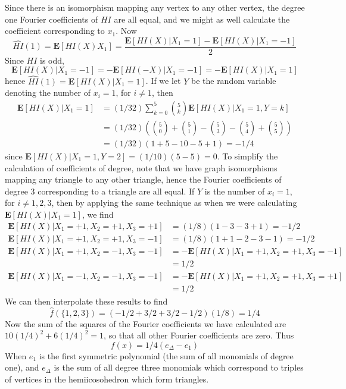 \begin{example}
    Since there is an isomorphism mapping any vertex to any other vertex, the degree one Fourier coefficients of $HI$ are all equal, and we might as well calculate the coefficient corresponding to $x_1$. Now
    \[ \widehat{HI}(1) = \mathbf{E}[HI(X)X_1] = \frac{\mathbf{E}[HI(X) | X_1 = 1] - \mathbf{E}[HI(X) | X_1 = -1]}{2} \]
    Since $HI$ is odd,
    \[ \mathbf{E}[HI(X) | X_1 = -1] = -\mathbf{E}[HI(-X) | X_1 = -1] = -\mathbf{E}[HI(X) | X_1 = 1] \]
    hence $\widehat{HI}(1) = \mathbf{E}[HI(X) | X_1 = 1]$. If we let $Y$ be the random variable denoting the number of $x_i = 1$, for $i \neq 1$, then
    \begin{align*}
        \mathbf{E}[HI(X) | X_1 = 1] &= (1/32) \sum_{k = 0}^5 {5 \choose k} \mathbf{E}[HI(X)|X_1 = 1, Y = k]\\
        &= (1/32) \left( {5 \choose 0} + {5 \choose 1} - {5 \choose 3} - {5 \choose 4} + {5 \choose 5} \right)\\
        &= (1/32)(1 + 5 - 10 - 5 + 1) = -1/4
    \end{align*}
    since $\mathbf{E}[HI(X) | X_1 = 1, Y = 2] = (1/10)(5 - 5) = 0$. To simplify the calculation of coefficients of degree, note that we have graph isomorphisms mapping any triangle to any other triangle, hence the Fourier coefficients of degree 3 corresponding to a triangle are all equal. If $Y$ is the number of $x_i = 1$, for $i \neq 1,2,3$, then by applying the same technique as when we were calculating $\mathbf{E}[HI(X) | X_1 = 1]$, we find
    \begin{align*}
        \mathbf{E}[HI(X) | X_1 = +1, X_2 = +1, X_3 = +1] &= (1/8)(1 - 3 - 3 + 1) = -1/2\\
        \mathbf{E}[HI(X) | X_1 = +1, X_2 = +1, X_3 = -1] &= (1/8)(1 + 1 - 2 - 3 - 1) = -1/2\\
        \mathbf{E}[HI(X) | X_1 = +1, X_2 = -1, X_3 = -1] &=  -\mathbf{E}[HI(X) | X_1 = +1, X_2 = +1, X_3 = -1]\\
        &= 1/2\\
        \mathbf{E}[HI(X) | X_1 = -1, X_2 = -1, X_3 = -1] &= - \mathbf{E}[HI(X) | X_1 = +1, X_2 = +1, X_3 = +1]\\
        &= 1/2
    \end{align*}
    We can then interpolate these results to find
    \[ \widehat{f}(\{ 1, 2, 3 \}) = (-1/2 + 3/2 + 3/2 - 1/2)(1/8) = 1/4 \]
    Now the sum of the squares of the Fourier coefficients we have calculated are $10(1/4)^2 + 6(1/4)^2 = 1$, so that all other Fourier coefficients are zero. Thus
    \[ f(x) = 1/4(e_\Delta - e_1) \]
    When $e_1$ is the first symmetric polynomial (the sum of all monomials of degree one), and $e_\Delta$ is the sum of all degree three monomials which correspond to triples of vertices in the hemiicosohedron which form triangles.
\end{example}


